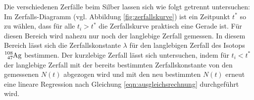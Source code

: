 Die verschiedenen Zerfälle beim Silber lassen sich wie folgt getrennt untersuchen:
Im Zerfalls-Diagramm (vgl. Abbildung \ref{fig:zerfallskurve}) ist ein Zeitpunkt $t^{*}$ so zu wählen, dass für alle $t_i>t^{*}$ die Zerfallskurve praktisch eine Gerade ist.
Für diesen Bereich wird nahezu nur noch der langlebige Zerfall gemessen.
In diesem Bereich lässt sich die Zerfallskonstante $\lambda$ für den langlebigen Zerfall des Isotops $\ce{^{108}_47Ag}$ bestimmen.
Der kurzlebige Zerfall lässt sich untersuchen, indem für $t_i<t^{*}$ der langlebige Zerfall mit der bereits bestimmten Zerfallskonstante von den gemessenen $N(t)$ abgezogen wird und mit den neu bestimmten $N(t)$ erneut eine lineare Regression nach Gleichung \eqref{eqn:ausgleichsrechnung} durchgeführt wird.
